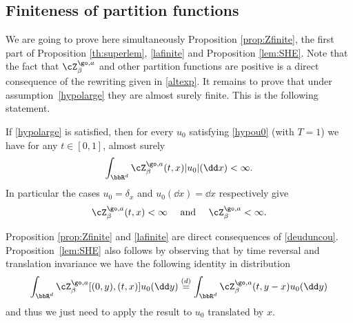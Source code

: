 \subsection{Finiteness of partition functions}
\label{sec:generalnoiseproof}

We are going to prove here simultaneously Proposition \ref{prop:Zfinite}, the first part of Proposition \ref{th:superlem}, \eqref{lafinite} and Proposition \ref{lem:SHE}.
Note that the fact that $\cZ^{\go,a}_{\beta}$ and other partition functions are positive is a direct consequence of the rewriting given in \eqref{altexp}. It remains to prove that under assumption~\eqref{hypolarge} they are almost surely finite.
This is the following statement.
\begin{proposition}\label{polopopo}
If \eqref{hypolarge} is satisfied, then for every $u_0$ satisfying \eqref{hypou0} (with $T=1$) we have for any $t\in [0,1]$, almost surely\vspace*{-3pt}
\begin{equation}
\int_{\bbR^d} \cZ^{\go,a}_{\beta}(t,x)|u_0|(\dd x)<\infty.
\end{equation}
In particular the cases $u_0=\delta_x$ and $u_0(\dd x)=\dd x$ respectively give
\begin{equation}\label{deuduncou}
\cZ^{\go,a}_{\beta}(t,x)<\infty \quad \text{ and } \quad \cZ^{\go,a}_{\beta}<\infty.
\end{equation}
\end{proposition}

\begin{rem}\label{proprop}
Proposition \ref{prop:Zfinite} and \eqref{lafinite} are direct consequences of \eqref{deuduncou}.
Proposition~\ref{lem:SHE} also follows by observing that by time reversal
and translation invariance we have the following identity in distribution\vspace*{-3pt}
\[
\int_{\bbR^d} \cZ^{\go,a}_{\beta}[(0,y),(t,x)]u_0(\dd y) \stackrel{(d)}{=} \int_{\bbR^d} \cZ^{\go,a}_{\beta}(t,y-x)u_0(\dd y)
\]
and thus we just need to apply the result to $u_0$ translated by $x$.
\end{rem}

